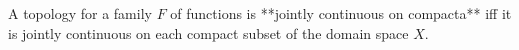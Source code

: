 A topology for a family $F$ of functions is **jointly continuous on compacta** iff it is jointly continuous on each compact subset of the domain space $X$.

